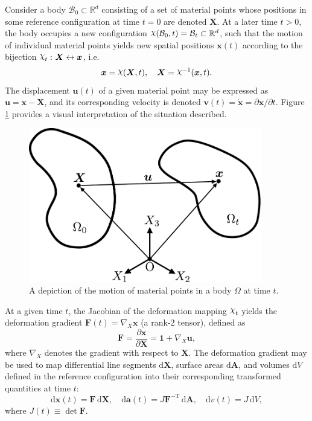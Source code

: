 Consider a body $\mathcal{B}_0 \subset \mathbb{R}^d$ consisting of a set of material points whose positions in some reference configuration at time $t = 0$ are denoted $\bm{X}$. At a later time $t > 0$, the body occupies a new configuration $\raisebox{\depth}{$\chi$} (\mathcal{B}_0, t) = \mathcal{B}_t \subset \mathbb{R}^d$, such that the motion of individual material points yields new spatial positions $\bm{x} (t)$ according to the bijection $\raisebox{\depth}{$\chi$}_t \, \colon \bm{X} \leftrightarrow \bm{x}$, i.e.
\begin{equation}
  \bm{x} = \raisebox{\depth}{$\chi$} (\bm{X}, t), \quad \bm{X} = \raisebox{\depth}{$\chi$}^{-1} (\bm{x}, t).
\end{equation}
The displacement $\bm{u} (t)$ of a given material point may be expressed as $\bm{u} = \bm{x} - \bm{X}$, and its corresponding velocity is denoted $\bm{v} (t) = \dot{\bm{x}} = \partial \bm{x} / \partial t$. Figure \ref{fig:kinematics} provides a visual interpretation of the situation described.
\begin{figure}[!h]
  \centering
  \includegraphics[width=4.0in]{figures/kinematics.pdf}
  \caption{A depiction of the motion of material points in a body $\Omega$ at time $t$.}
  \label{fig:kinematics}
\end{figure}

At a given time $t$, the Jacobian of the deformation mapping $\raisebox{\depth}{$\chi$}_t$ yields the deformation gradient $\bm{F} (t) = \nabla_X \bm{x}$ (a rank-2 tensor), defined as
\begin{equation}
  \bm{F} = \frac{\partial \bm{x}}{\partial \bm{X}} = \bm{1} + \nabla_X \bm{u},
\end{equation}
where $\nabla_X$ denotes the gradient with respect to $\bm{X}$. The deformation gradient may be used to map differential line segments $\mathrm d \bm{X}$, surface areas $\mathrm d \bm{A}$, and volumes $\mathrm d V$ defined in the reference configuration into their corresponding transformed quantities at time $t$:
\begin{equation}
  \mathrm d \bm{x}(t) = \bm{F} \, \mathrm d \bm{X}, \quad \mathrm d \bm{a}(t) = J \bm{F}^{-\mathrm T} \, \mathrm d \bm{A}, \quad \mathrm d v(t) = J \, \mathrm d V,
\end{equation}
where $J(t) \equiv \det{\bm{F}}$.

